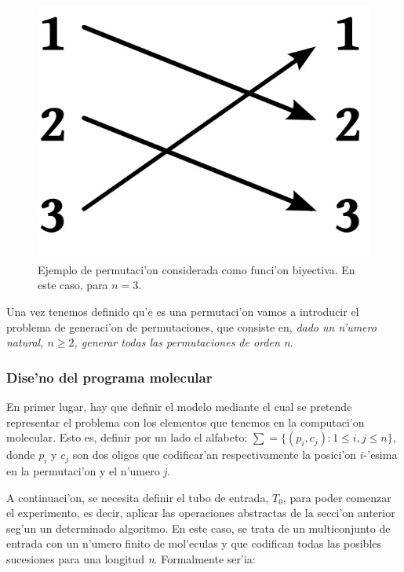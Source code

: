 \documentclass[12pt]{article}
\begin{document}
\begin{figure}[h]
\centering
\includegraphics[scale=0.6]{permutaciones}
\caption{Ejemplo de permutaci'on considerada como funci'on biyectiva. En este caso, para $n = 3$.}
\end{figure}

Una vez tenemos definido qu'e es una permutaci'on vamos a introducir el problema de generaci'on de
permutaciones, que consiste en, \textit{dado un n'umero natural, $n \geq 2$, generar todas las permutaciones
 de orden n}.

\subsubsection{Dise'no del programa molecular}

En primer lugar, hay que definir el modelo mediante el cual se pretende representar el problema con los
elementos que tenemos en la computaci'on molecular. Esto es, definir por un lado el alfabeto:
$ \sum = \{(p_{i},c_{j}) : 1 \leq i,j \leq n\} $, donde $p_{i}$ y $c_{j}$ son dos oligos que codificar'an
respectivamente la posici'on $i$-'esima en la permutaci'on y el n'umero \textit{j}.

A continuaci'on, se necesita definir el tubo de entrada, $T_{0}$, para poder comenzar el experimento, es decir,
aplicar las operaciones abstractas de la secci'on anterior seg'un un determinado algoritmo. En este caso,
se trata de un multiconjunto de entrada con un n'umero finito de mol'eculas y que codifican todas las
posibles sucesiones para una longitud \textit{n}. Formalmente ser'ia:
\end{document}
